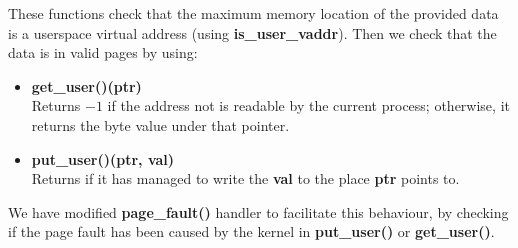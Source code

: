 \documentclass{report}
\newcommand{\bullpara}[2]{\item \textbf{#1} \ #2}
\newcommand{\fun}[1]{\textcolor{Emerald}{\textbf{#1}}}
\newcommand{\file}[1]{\textcolor{YellowGreen}{\textbf{#1}}}
\newcommand{\var}[1]{\textcolor{RoyalPurple}{\textbf{#1}}}
\newcommand{\pintoscode}[4]{}
\newcommand{\pintosfile}[3]{\pintoscode{#1}{#2}{\file{#3}}{#3}}
\begin{document}
                    \pintosfile{129}{144}{syscall.c}

                    \pintosfile{112}{127}{syscall.c}
                    
                    These functions check that the maximum memory location of the provided data is a userspace virtual address (using \fun{is\_user\_vaddr}).
                    Then we check that the data is in valid pages by using:
                    \begin{itemize}
                        \bullpara{\fun{get\_user()}(\var{ptr})}{
                            \\ Returns $-1$ if the address not is readable by the current process; otherwise, it returns the byte value under that pointer.
                        }
                        \bullpara{\fun{put\_user()}(\var{ptr}, val)}{
                            \\ Returns if it has managed to write the \var{val} to the place \var{ptr} points to.
                        }
                    \end{itemize}
                    We have modified \fun{page\_fault()} handler to facilitate this behaviour, by checking if the page fault has been caused by the kernel in \fun{put\_user()} or \fun{get\_user()}.
                    \pintosfile{155}{162}{exception.c}
            
\end{document}
